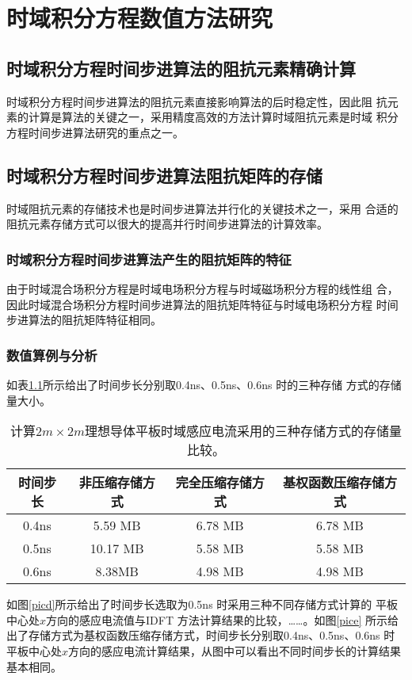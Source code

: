 \documentclass{standalone}
\begin{document}
\chapter{时域积分方程数值方法研究}
\section{时域积分方程时间步进算法的阻抗元素精确计算}
时域积分方程时间步进算法的阻抗元素直接影响算法的后时稳定性，因此阻
抗元素的计算是算法的关键之一，采用精度高效的方法计算时域阻抗元素是时域
积分方程时间步进算法研究的重点之一。

\section{时域积分方程时间步进算法阻抗矩阵的存储}
时域阻抗元素的存储技术也是时间步进算法并行化的关键技术之一，采用
合适的阻抗元素存储方式可以很大的提高并行时间步进算法的计算效率。

\subsection{时域积分方程时间步进算法产生的阻抗矩阵的特征}

由于时域混合场积分方程是时域电场积分方程与时域磁场积分方程的线性组
合，因此时域混合场积分方程时间步进算法的阻抗矩阵特征与时域电场积分方程
时间步进算法的阻抗矩阵特征相同。
\subsection{数值算例与分析}
如表\ref{tablea}所示给出了时间步长分别取0.4ns、0.5ns、0.6ns 时的三种存储
方式的存储量大小。

\begin{table}[h]
	\caption{计算$2m\times 2m$理想导体平板时域感应电流采用的三种存储方式的存储量比较。} 
	\begin{tabular}{|c|c|c|c|} 
		\hline  
		时间步长 & 非压缩存储方式 & 完全压缩存储方式 & 基权函数压缩存储方式 \\
		\hline 
		0.4ns & 5.59 MB & 6.78 MB & 6.78 MB\\  
		\hline  
		0.5ns & 10.17 MB & 5.58 MB & 5.58 MB \\  
		\hline  
		0.6ns & 8.38MB & 4.98 MB & 4.98 MB \\  
		\hline  
	\end{tabular}
	\label{tablea}
\end{table}

如图\ref{picd}所示给出了时间步长选取为0.5ns 时采用三种不同存储方式计算的
平板中心处$x$方向的感应电流值与IDFT 方法计算结果的比较，……。如图\ref{pice}
所示给出了存储方式为基权函数压缩存储方式，时间步长分别取0.4ns、0.5ns、0.6ns
时平板中心处$x$方向的感应电流计算结果，从图中可以看出不同时间步长的计算结果基本相同。
\end{document}
